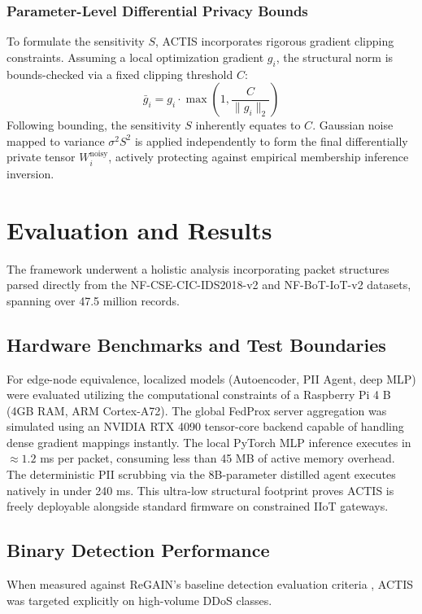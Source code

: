 \documentclass[conference]{IEEEtran}
\begin{document}
\subsubsection{Parameter-Level Differential Privacy Bounds}
To formulate the sensitivity $S$, ACTIS incorporates rigorous gradient clipping constraints. Assuming a local optimization gradient $g_i$, the structural norm is bounds-checked via a fixed clipping threshold $C$:
\begin{equation}
\bar{g}_i = g_i \cdot \max\left(1, \frac{C}{\|g_i\|_2}\right) 
\end{equation}
Following bounding, the sensitivity $S$ inherently equates to $C$. Gaussian noise mapped to variance $\sigma^2S^2$ is applied independently to form the final differentially private tensor $W_i^{\text{noisy}}$, actively protecting against empirical membership inference inversion.

\section{Evaluation and Results}
The framework underwent a holistic analysis incorporating packet structures parsed directly from the NF-CSE-CIC-IDS2018-v2 and NF-BoT-IoT-v2 datasets, spanning over 47.5 million records.

\subsection{Hardware Benchmarks and Test Boundaries}
For edge-node equivalence, localized models (Autoencoder, PII Agent, deep MLP) were evaluated utilizing the computational constraints of a Raspberry Pi 4 B (4GB RAM, ARM Cortex-A72). The global FedProx server aggregation was simulated using an NVIDIA RTX 4090 tensor-core backend capable of handling dense gradient mappings instantly. The local PyTorch MLP inference executes in \(\approx 1.2\) ms per packet, consuming less than 45 MB of active memory overhead. The deterministic PII scrubbing via the 8B-parameter distilled agent executes natively in under 240 ms. This ultra-low structural footprint proves ACTIS is freely deployable alongside standard firmware on constrained IIoT gateways.

\subsection{Binary Detection Performance}
When measured against ReGAIN’s baseline detection evaluation criteria \cite{ref2ReGAIN}, ACTIS was targeted explicitly on high-volume DDoS classes.
\end{document}
